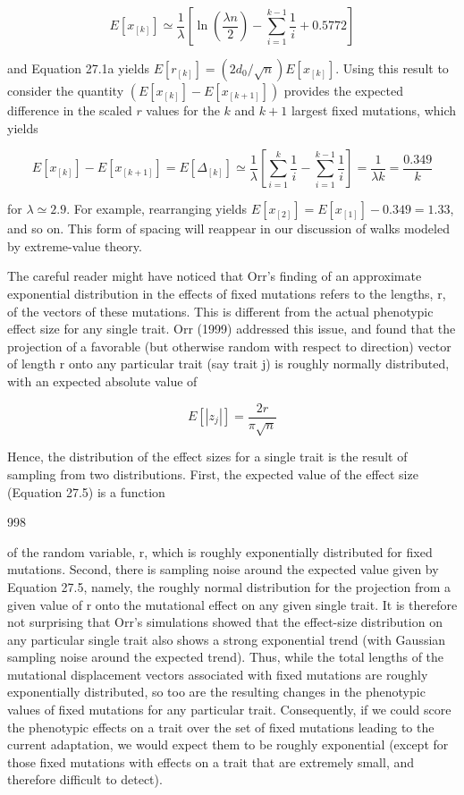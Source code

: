 \documentclass{article}
\begin{document}
\begin{equation}
E[x_{[k]}]\simeq\frac{1}{\lambda}\left[\ln\left(\frac{\lambda n}{2}\right)-\sum_{i=1}^{k-1}\frac{1}{i}+0.5772\right]
\tag{27.4b}
\label{eq:27_4b}
\end{equation}

and Equation 27.1a yields  $ E[r_{[k]}] = (2d_0/\sqrt{n})E[x_{[k]}] $. Using this result to consider the quantity  $ (E[x_{[k]}] - E[x_{[k+1]}]) $ provides the expected difference in the scaled  $ r $ values for the  $ k $ and  $ k + 1 $ largest fixed mutations, which yields

\begin{equation}
E[x_{[k]}]-E[x_{[k+1]}]=E[\Delta_{[k]}]\simeq\frac{1}{\lambda}\left[\sum_{i=1}^{k}\frac{1}{i}-\sum_{i=1}^{k-1}\frac{1}{i}\right]=\frac{1}{\lambda k}=\frac{0.349}{k}
\tag{27.4c}
\label{eq:27_4c}
\end{equation}

for  $ \lambda \simeq 2.9 $. For example, rearranging yields  $ E[x_{[2]}] = E[x_{[1]}] - 0.349 = 1.33 $, and so on. This form of spacing will reappear in our discussion of walks modeled by extreme-value theory.

The careful reader might have noticed that Orr’s finding of an approximate exponential distribution in the effects of fixed mutations refers to the lengths, r, of the vectors of these mutations. This is different from the actual phenotypic effect size for any single trait. Orr (1999) addressed this issue, and found that the projection of a favorable (but otherwise random with respect to direction) vector of length r onto any particular trait (say trait j) is roughly normally distributed, with an expected absolute value of

\begin{equation}
E[|z_{j}|]=\frac{2r}{\pi\sqrt{n}}
\tag{27.5}
\label{eq:27_5}
\end{equation}

Hence, the distribution of the effect sizes for a single trait is the result of sampling from two distributions. First, the expected value of the effect size (Equation 27.5) is a function

998

of the random variable, r, which is roughly exponentially distributed for fixed mutations. Second, there is sampling noise around the expected value given by Equation 27.5, namely, the roughly normal distribution for the projection from a given value of r onto the mutational effect on any given single trait. It is therefore not surprising that Orr's simulations showed that the effect-size distribution on any particular single trait also shows a strong exponential trend (with Gaussian sampling noise around the expected trend). Thus, while the total lengths of the mutational displacement vectors associated with fixed mutations are roughly exponentially distributed, so too are the resulting changes in the phenotypic values of fixed mutations for any particular trait. Consequently, if we could score the phenotypic effects on a trait over the set of fixed mutations leading to the current adaptation, we would expect them to be roughly exponential (except for those fixed mutations with effects on a trait that are extremely small, and therefore difficult to detect).
\end{document}

